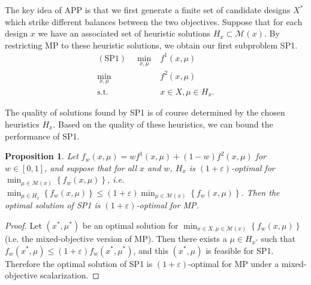 \documentclass[11pt,authoryear,a4paper]{article}
\newtheorem{proposition}{Proposition}
\theoremstyle{definition}
\begin{document}
{The key idea of APP is that we first generate a finite set of candidate designs $X^*$ which strike different balances between the two objectives. Suppose that for each design $x$ we have an associated set of heuristic solutions $H_x\subset\mathcal{M}(x)$. By restricting MP to these heuristic solutions, we obtain our first subproblem SP1.
\begin{align*}
    (\text{SP1})\quad \min_{x,\mu}   & f^1(x,\mu)\\
                \min_{x,\mu}   & f^2(x,\mu)\\
                \text{s.t. } & x\in X, \mu\in H_x. 
\end{align*}


{The quality of solutions found by SP1 is of course determined by the chosen heuristics $H_x$. Based on the quality of these heuristics, we can bound the performance of SP1.
\begin{proposition}
    Let $f_w(x,\mu)=wf^1(x,\mu)+(1-w)f^2(x,\mu)$ for $w\in[0,1]$, and suppose that for all $x$ and $w$, $H_x$ is $(1+\varepsilon)$-optimal for $\min_{\mu\in\mathcal{M}(x)}\left\{f_w(x,\mu)\right\}$, i.e. $\min_{\mu\in H_x}\left\{f_w(x,\mu)\right\}\leq (1+\varepsilon)\min_{\mu\in \mathcal{M}(x)}\left\{f_w(x,\mu)\right\}$. Then the optimal solution of SP1 is $(1+\varepsilon)$-optimal for MP.
\end{proposition}
\begin{proof}
    Let $(x^*,\mu^*)$ be an optimal solution for $\min_{x\in X,\mu\in\mathcal{M}(x)}\left\{f_w(x,\mu)\right\}$ (i.e. the mixed-objective version of MP). Then there exists a $\mu\in H_{x^*}$ such that $f_w(x^*,\mu)\leq (1+\varepsilon)f_w(x^*,\mu^*)$, and this $(x^*,\mu)$ is feasible for SP1. Therefore the optimal solution of SP1 is $(1+\varepsilon)$-optimal for MP under a mixed-objective scalarization.
\end{proof}}

}
\end{document}
